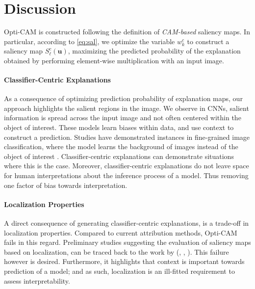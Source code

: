 \section{Discussion}
\label{sec:discuss_opticam}
\noindent Opti-CAM is constructed following the definition of \emph{CAM-based} saliency maps. In 
particular, according to \autoref{eq:sal}, we optimize the variable $w^c_k$ to construct a 
saliency map $S^c_\ell(\mathbf{u})$, maximizing the predicted probability of the explanation 
obtained by performing element-wise multiplication with an input image. \\

\paragraph{Classifier-Centric Explanations} As a consequence of optimizing prediction probability 
of explanation maps, our approach highlights the salient regions in the image. We observe 
in CNNs, salient information is spread across the input image and not often centered within the 
object of interest. These models learn biases within data, and use context to construct a 
prediction. Studies have demonstrated instances in fine-grained image classification, where the 
model learns the background of images instead of the object of interest \autocite{petryk2022guiding}.  
Classifier-centric explanations can demonstrate situations where this is the case. Moreover, 
classifier-centric explanations do not leave space for human interpretations about the inference 
process of a model. Thus removing one factor of bias towards interpretation.\\

\paragraph{Localization Properties} A direct consequence of generating classifier-centric 
explanations, is a trade-off in localization properties. Compared to current 
attribution methods, Opti-CAM fails in this regard. Preliminary studies suggesting the evaluation 
of saliency maps based on localization, can be traced back to the work by (\cite{shetty2019not}, 
\cite{zhou2018interpreting}, \cite{rao2022towards}). This failure however is desired. Furthermore, 
it highlights that context is important towards prediction of a model; and as such, localization 
is an ill-fitted requirement to assess interpretability.\\

